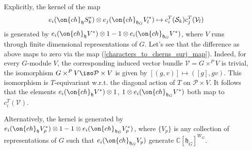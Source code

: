\documentclass[12pt]{amsart}
\begin{document}
Explicitly, the kernel of the map 
\begin{equation}\label{characters_to_cherns_surj_map}
e_i(\on{ch}_{\mathfrak{h}}S_k^*) \otimes e_j(\on{ch}_{\mathfrak{h}_G}V_l^*) \mapsto c_i^T(\mathcal{S}_k)c_j^T(\mathcal{V}_l)
\end{equation} 
is generated by $e_i(\on{ch}_{\mathfrak{h}}V^*) \otimes 1 - 1 \otimes e_i(\on{ch}_{\mathfrak{h}_G}V^*)$, where $V$ runs through finite dimensional representations of $G$. Let's see that the difference as above maps to zero via the map (\ref{characters_to_cherns_surj_map}).
Indeed, for every $G$-module $V$, the corresponding induced vector bundle $\mathcal{V} = G \times^P V$ is trivial, the isomorphism $G \times^P V \iso \mathcal{P} \times V$ is given by $[(g,v)] \mapsto ([g],gv)$. This  isomorphism is $T$-equivariant w.r.t. the diagonal action of $T$ on $\mathcal{P} \times V$. It follows that the elements $e_i(\on{ch}_{\mathfrak{h}}V^*) \otimes 1$, $1 \otimes e_i(\on{ch}_{\mathfrak{h}_G}V^*)$ both map to $c_i^T(\mathcal{V})$.



Alternatively, the kernel is generated by $e_i(\on{ch}_{\mathfrak{h}}V_p^*) \otimes 1 - 1 \otimes e_i(\on{ch}_{\mathfrak{h}_G}V_p^*)$, where $\{V_p\}$ is any collection of representations of $G$ such that $e_i(\on{ch}_{\mathfrak{h}_G}V_p)$ generate $\mathbb{C}[\mathfrak{h}_G]^{W_G}$.
    
\end{document}
